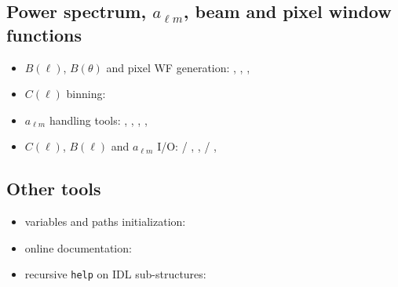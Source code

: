 \subsection[Power spectrum, alm, beam and pixel window functions]{Power spectrum, $a_{\ell m}$, beam and pixel window functions}
\begin{itemize}
%
\item $B(\ell)$, $B(\theta)$ and pixel WF generation:
,
,
,
%
\item $C(\ell)$ binning:
%
\item $a_{\ell m}$ handling tools:
,
,
,
,
%
\item $C(\ell)$, $B(\ell)$ and $a_{\ell m}$ I/O:
/%
,
,
/%
,
%
\end{itemize}

\subsection{Other tools}
\begin{itemize}
\item \healpix variables and paths initialization: 
\item online documentation: 
\item recursive {\tt help} on IDL sub-structures: 
\end{itemize}


%  
% 
% 
